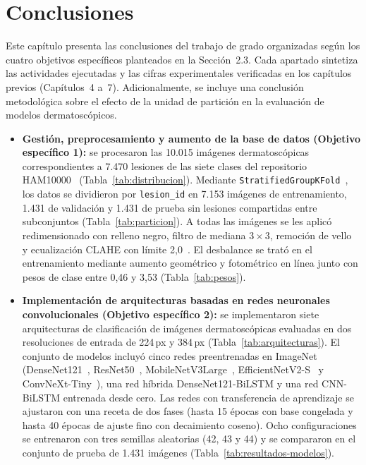 \chapter{Conclusiones}

Este capítulo presenta las conclusiones del trabajo de grado organizadas según los cuatro objetivos específicos planteados en la Sección~2.3. Cada apartado sintetiza las actividades ejecutadas y las cifras experimentales verificadas en los capítulos previos (Capítulos~4 a~7). Adicionalmente, se incluye una conclusión metodológica sobre el efecto de la unidad de partición en la evaluación de modelos dermatoscópicos.

\begin{itemize}
  \item \textbf{Gestión, preprocesamiento y aumento de la base de datos (Objetivo específico 1):} se procesaron las 10.015 imágenes dermatoscópicas correspondientes a 7.470 lesiones de las siete clases del repositorio HAM10000~\cite{tschandl2018ham10000} (Tabla~\ref{tab:distribucion}). Mediante \texttt{StratifiedGroupKFold}~\cite{pedregosa2011sklearn}, los datos se dividieron por \texttt{lesion\_id} en 7.153 imágenes de entrenamiento, 1.431 de validación y 1.431 de prueba sin lesiones compartidas entre subconjuntos (Tabla~\ref{tab:particion}). A todas las imágenes se les aplicó redimensionado con relleno negro, filtro de mediana $3 \times 3$, remoción de vello~\cite{lee1997dullrazor,telea2004inpainting} y ecualización CLAHE con límite 2,0~\cite{zuiderveld1994clahe}. El desbalance se trató en el entrenamiento mediante aumento geométrico y fotométrico en línea junto con pesos de clase entre 0,46 y 3,53 (Tabla~\ref{tab:pesos}).

  \item \textbf{Implementación de arquitecturas basadas en redes neuronales convolucionales (Objetivo específico 2):} se implementaron siete arquitecturas de clasificación de imágenes dermatoscópicas evaluadas en dos resoluciones de entrada de 224\,px y 384\,px (Tabla~\ref{tab:arquitecturas}). El conjunto de modelos incluyó cinco redes preentrenadas en ImageNet~\cite{deng2009imagenet} (DenseNet121~\cite{huang2017densenet}, ResNet50~\cite{he2016resnet}, MobileNetV3Large~\cite{howard2019mobilenetv3}, EfficientNetV2-S~\cite{tan2021efficientnetv2} y ConvNeXt-Tiny~\cite{liu2022convnext}), una red híbrida DenseNet121-BiLSTM y una red CNN-BiLSTM entrenada desde cero. Las redes con transferencia de aprendizaje se ajustaron con una receta de dos fases (hasta 15 épocas con base congelada y hasta 40 épocas de ajuste fino con decaimiento coseno). Ocho configuraciones se entrenaron con tres semillas aleatorias (42, 43 y 44) y se compararon en el conjunto de prueba de 1.431 imágenes (Tabla~\ref{tab:resultados-modelos}).


\end{itemize}
